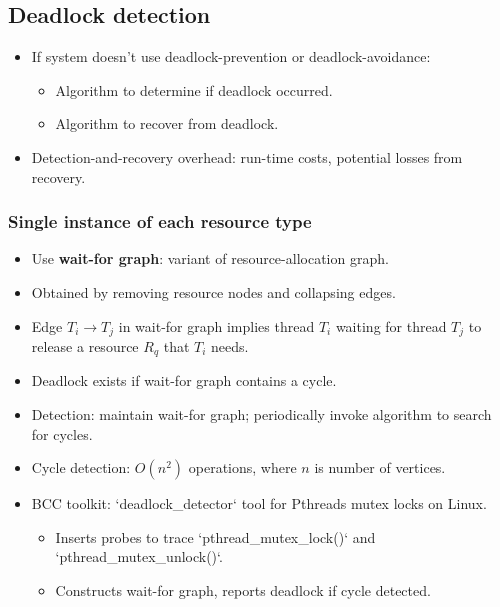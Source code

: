 \subsection{Deadlock detection}
\begin{itemize}
    \item If system doesn't use deadlock-prevention or deadlock-avoidance:
    \begin{itemize}
        \item Algorithm to determine if deadlock occurred.
        \item Algorithm to recover from deadlock.
    \end{itemize}
    \item Detection-and-recovery overhead: run-time costs, potential losses from recovery.
\end{itemize}

\subsubsection{Single instance of each resource type}
\begin{itemize}
    \item Use \textbf{wait-for graph}: variant of resource-allocation graph.
    \item Obtained by removing resource nodes and collapsing edges.
    \item Edge $T_i \to T_j$ in wait-for graph implies thread $T_i$ waiting for thread $T_j$ to release a resource $R_q$ that $T_i$ needs.
    \item Deadlock exists if wait-for graph contains a cycle.
    \item Detection: maintain wait-for graph; periodically invoke algorithm to search for cycles.
    \item Cycle detection: $O(n^2)$ operations, where $n$ is number of vertices.
    \item BCC toolkit: `deadlock\_detector` tool for Pthreads mutex locks on Linux.
    \begin{itemize}
        \item Inserts probes to trace `pthread\_mutex\_lock()` and `pthread\_mutex\_unlock()`.
        \item Constructs wait-for graph, reports deadlock if cycle detected.
    \end{itemize}
\end{itemize}


